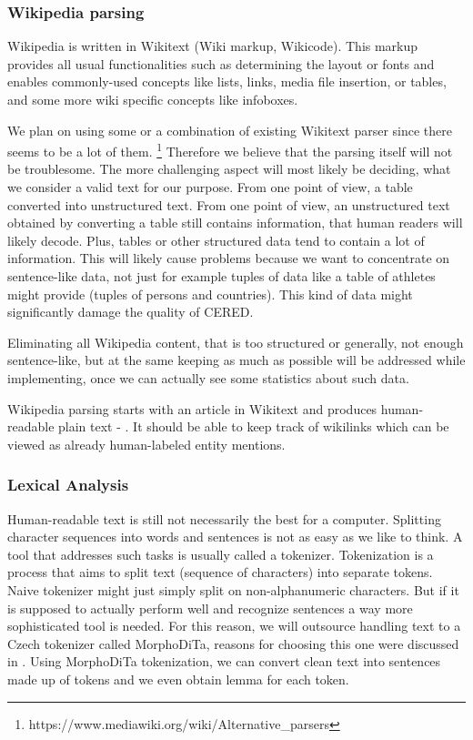\subsubsection{Wikipedia parsing}
Wikipedia is written in Wikitext (Wiki markup, Wikicode). This markup provides all usual functionalities such as determining the layout or fonts and enables commonly-used concepts like lists, links, media file insertion, or tables, and some more wiki specific concepts like infoboxes.

We plan on using some or a combination of existing Wikitext parser since there seems to be a lot of them. \footnote{https://www.mediawiki.org/wiki/Alternative\_parsers} Therefore we believe that the parsing itself will not be troublesome. The more challenging aspect will most likely be deciding, what we consider a valid text for our purpose. From one point of view, a table converted into unstructured text. From one point of view, an unstructured text obtained by converting a table still contains information, that human readers will likely decode. Plus, tables or other structured data tend to contain a lot of information. This will likely cause problems because we want to concentrate on sentence-like data, not just for example tuples of data like a table of athletes might provide (tuples of persons and countries). This kind of data might significantly damage the quality of CERED.

Eliminating all Wikipedia content, that is too structured or generally, not enough sentence-like, but at the same keeping as much as possible will be addressed while implementing, once we can actually see some statistics about such data.

Wikipedia parsing starts with an article in Wikitext and produces human-readable plain text - . It should be able to keep track of wikilinks which can be viewed as already human-labeled entity mentions.

\subsubsection{Lexical Analysis}
Human-readable text is still not necessarily the best for a computer. Splitting character sequences into words and sentences is not as easy as we like to think. A tool that addresses such tasks is usually called a tokenizer.
Tokenization is a process that aims to split text (sequence of characters) into separate tokens. Naive tokenizer might just simply split on non-alphanumeric characters. But if it is supposed to actually perform well and recognize sentences a way more sophisticated tool is needed. For this reason, we will outsource handling text to a Czech tokenizer called MorphoDiTa, reasons for choosing this one were discussed in . Using MorphoDiTa tokenization, we can convert clean text into sentences made up of tokens and we even obtain lemma for each token.

